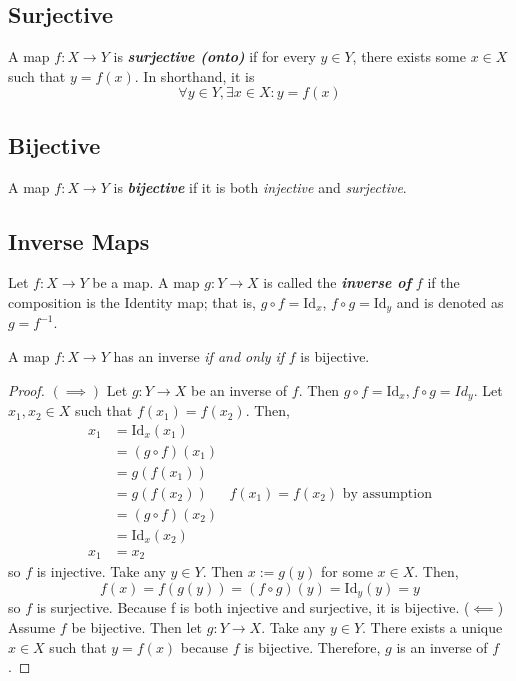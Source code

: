 \documentclass{report}
\newcommand{\textib}[1]{\textit{\textbf{{#1}}}}
\newcommand{\Id}{\text{Id}}
\newcommand{\proposition}[1]{\begin{tcolorbox}[title=\textit{Proposition}]{#1}\end{tcolorbox}}
\begin{document}
\subsection{Surjective}
A map $f : X \to Y$ is \textib{surjective (onto)} if for every $y \in Y$, there exists some $x \in X$
such that $y = f(x)$. In shorthand, it is
\[\forall y \in Y, \exists x \in X : y = f(x)\]


\subsection{Bijective}
A map $f : X \to Y$ is \textib{bijective} if it is both \textit{injective} and \textit{surjective}.


\subsection{Inverse Maps}
Let $f : X \to Y$ be a map. A map $g : Y \to X$ is called the \textib{inverse of} $f$ if the composition
is the Identity map; that is, $g \circ f = \Id_x$, $f \circ g = \Id_y$ and is denoted as $g = f^{-1}$.

\proposition{
    A map $f : X \to Y$ has an inverse \textit{if and only if} $f$ is bijective.
}
\begin{proof}
    $(\implies)$ Let $g : Y \to X$ be an inverse of $f$. Then $g \circ f = \Id_x, f \circ g = Id_y$.
    Let $x_1, x_2 \in X$ such that $f(x_1) = f(x_2)$. Then, 
    \begin{align*}
        x_1 &= \Id_x(x_1) \\
            &= (g \circ f)(x_1) \\
            &= g(f(x_1)) \\
            &= g(f(x_2)) & f(x_1) = f(x_2) \text{ by assumption} \\
            &= (g \circ f)(x_2) \\
            &= \Id_x(x_2) \\
        x_1 &= x_2
    \end{align*}
    so $f$ is injective.
    \newline
    \newline
    Take any $y \in Y$. Then $x := g(y)$ for some $x \in X$. Then, 
    \[f(x) = f(g(y)) = (f \circ g)(y) = \Id_y(y) = y\]
    so $f$ is surjective. Because f is both injective and surjective, it is bijective.
    \newline
    \newline
    ($\impliedby$) Assume $f$ be bijective. Then let $g : Y \to X$. Take any $y \in Y$. There
    exists a unique $x \in X$ such that $y = f(x)$ because $f$ is bijective. Therefore, $g$ is an
    inverse of $f$.
\end{proof}
\end{document}
